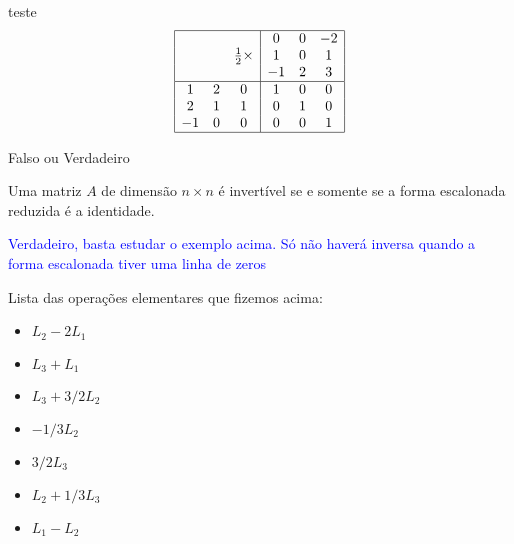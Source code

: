 \documentclass{beamer}
\begin{document}
\begin{frame}{teste}
  $$
  \begin{array}{|ccc|ccc|} \hline
    & & &0 &0 & -2\\
    & &\frac{1}{2} \times &1 &0 & 1\\
    & & &-1 & 2& 3 \\ \hline
   1 &2 & 0&1 & 0& 0\\
   2 & 1& 1& 0& 1& 0\\
   -1 & 0& 0&0 & 0& 1\\ \hline
  \end{array}
  $$
\end{frame}
\begin{frame}{Falso ou Verdadeiro}

  \begin{block}{1}
 Uma matriz $A$ de dimensão $n\times n$ é invertível
 se e somente se a forma escalonada reduzida é a identidade.
  \end{block}

  \textcolor{blue}{ Verdadeiro, basta estudar o exemplo acima. Só não haverá inversa quando a forma escalonada tiver
  uma linha de zeros}
  
\end{frame}

\begin{frame}
  Lista das operações elementares que fizemos acima:
  \begin{itemize}
    \item $L_2 -2L_1$
    \item $L_3 + L_1$
    \item $L_3 + 3/2L_2$
    \item $-1/3L_2$
    \item $3/2L_3$
    \item $L_2+1/3L_3$
    \item $L_1 -L_2$
  \end{itemize}
\end{frame}
\end{document}
